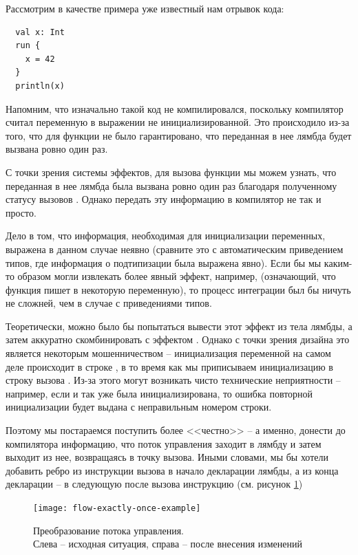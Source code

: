 Рассмотрим в качестве примера уже известный нам отрывок кода:

\begin{verbatim}
  val x: Int
  run {
    x = 42
  }
  println(x)
\end{verbatim}

Напомним, что изначально такой код не компилировался, поскольку компилятор считал переменную  в выражении  не инициализированной. Это происходило из-за того, что для функции  не было гарантировано, что переданная в нее лямбда  будет вызвана ровно один раз.

С точки зрения системы эффектов, для вызова функции  мы можем узнать, что переданная в нее лямбда была вызвана ровно один раз благодаря полученному статусу вызовов . Однако передать эту информацию в компилятор не так и просто.

Дело в том, что информация, необходимая для инициализации переменных, выражена в данном случае неявно (сравните это с автоматическим приведением типов, где информация о подтипизации была выражена явно). Если бы мы каким-то образом могли извлекать более явный эффект, например,  (означающий, что функция пишет в некоторую переменную), то процесс интеграции был бы ничуть не сложней, чем в случае с приведениями типов.

Теоретически, можно было бы попытаться вывести этот эффект из тела лямбды, а затем аккуратно скомбинировать с эффектом . Однако с точки зрения дизайна это является некоторым мошенничеством -- инициализация переменной на самом деле происходит в строке , в то время как мы приписываем инициализацию в строку вызова . Из-за этого могут возникать чисто технические неприятности -- например, если  и так уже была инициализирована, то ошибка повторной инициализации будет выдана с неправильным номером строки.

Поэтому мы постараемся поступить более <<честно>> -- а именно, донести до компилятора информацию, что поток управления заходит в лямбду и затем выходит из нее, возвращаясь в точку вызова. Иными словами, мы бы хотели добавить ребро из инструкции вызова в начало декларации лямбды, а из конца декларации -- в следующую после вызова инструкцию (см. рисунок \ref{fig:flow-exactly-once-example})

\begin{figure}[h]
  \texttt{[image: flow-exactly-once-example]}

  \caption{Преобразование потока управления. \\ Слева -- исходная ситуация, справа -- после внесения изменений}
  \label{fig:flow-exactly-once-example}
\end{figure}

